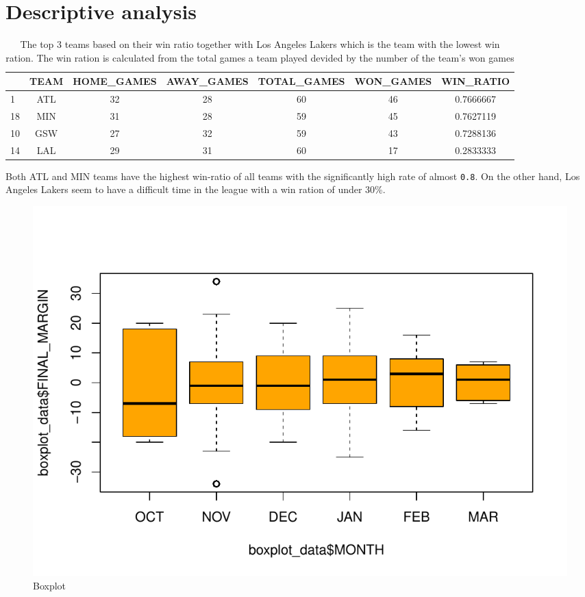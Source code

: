 \documentclass[
  11pt,
]{article}
\begin{document}
\pagebreak

\hypertarget{descriptive-analysis}{%
\section{Descriptive analysis}\label{descriptive-analysis}}

\begin{table}[H]

\caption{\label{tab:games-data-per-team}The top 3 teams based on their win ratio together with Los Angeles Lakers which is the team with the lowest win ration. The win ration is calculated from the total games a team played devided by the number of the team's won games}
\centering
\begin{tabular}[t]{lcccccc}
\toprule
  & TEAM & HOME\_GAMES & AWAY\_GAMES & TOTAL\_GAMES & WON\_GAMES & WIN\_RATIO\\
\midrule
1 & ATL & 32 & 28 & 60 & 46 & 0.7666667\\
18 & MIN & 31 & 28 & 59 & 45 & 0.7627119\\
10 & GSW & 27 & 32 & 59 & 43 & 0.7288136\\
14 & LAL & 29 & 31 & 60 & 17 & 0.2833333\\
\bottomrule
\end{tabular}
\end{table}

Both ATL and MIN teams have the highest win-ratio of all teams with the significantly high rate of almost \texttt{0.8}. On the other hand, Los Angeles Lakers seem to have a difficult time in the league with a win ration of under 30\%.

\begin{figure}

{\centering \includegraphics{index_files/figure-latex/final-margin-boxplot-1} 

}

\caption{Boxplot}\label{fig:final-margin-boxplot}
\end{figure}
\end{document}
